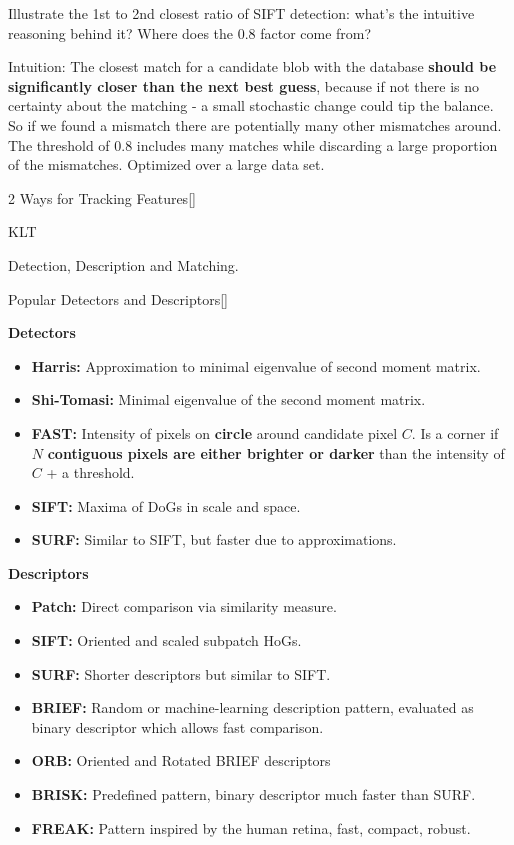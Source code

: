 \documentclass[10pt,a4paper]{scrartcl}
\begin{document}
\begin{multicols*}{2}
\begin{QandA}
{Illustrate the 1st to 2nd closest ratio of SIFT detection: what’s the intuitive
reasoning behind it? Where does the 0.8 factor come from?}
\item Intuition: The closest match for a candidate blob with the database \textbf{should be significantly closer than the next best guess}, because if not there is no certainty about the matching - a small stochastic change could tip the balance. So if we found a mismatch there are potentially many other mismatches around. The threshold of 0.8 includes many matches while discarding a large proportion of the mismatches. Optimized over a large data set.
\end{QandA}

\begin{QandA}{2 Ways for Tracking Features}[\Application]
\item KLT
\item Detection, Description and Matching.
\end{QandA}

\begin{QandA}{Popular Detectors and Descriptors}[\Comparison]
\item \textbf{Detectors}
\begin{itemize}
\item \textbf{Harris:} Approximation to minimal eigenvalue of second moment matrix.
\item \textbf{Shi-Tomasi:} Minimal eigenvalue of the second moment matrix.
\item \textbf{FAST:} Intensity of pixels on \textbf{circle} around candidate pixel $C$. Is a corner if $N$ \textbf{contiguous pixels are either brighter or darker} than the intensity of $C$ + a threshold.
\item \textbf{SIFT:} Maxima of DoGs in scale and space.
\item \textbf{SURF:} Similar to SIFT, but faster due to approximations.
\end{itemize}
\item \textbf{Descriptors}
\begin{itemize}
\item \textbf{Patch:} Direct comparison via similarity measure.
\item \textbf{SIFT:} Oriented and scaled subpatch HoGs.
\item \textbf{SURF:} Shorter descriptors but similar to SIFT.
\item \textbf{BRIEF:} Random or machine-learning description pattern, evaluated as binary descriptor which allows fast comparison.
\item \textbf{ORB:} Oriented and Rotated BRIEF descriptors
\item \textbf{BRISK:} Predefined pattern, binary descriptor much faster than SURF.
\item \textbf{FREAK:} Pattern inspired by the human retina, fast, compact, robust.
\end{itemize}
\end{QandA}


\end{multicols*}
\end{document}
